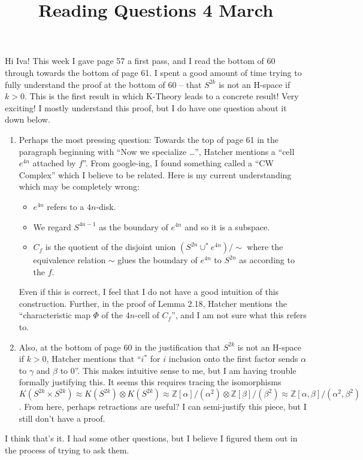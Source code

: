 \documentclass[12]{amsart}
\title{Reading Questions 4 March}
\newcommand{\tiso}{\approx}
\begin{document}
\maketitle

Hi Iva! This week I gave page 57 a first pass, and I read the bottom of 60 through towards the bottom of page 61. I spent a good amount of time trying to fully understand the proof at the bottom of 60 -- that $S^{2k}$ is not an H-space if $k > 0$. This is the first result in which K-Theory leads to a concrete result! Very exciting! I mostly understand this proof, but I do have one question about it down below.

\begin{enumerate}
	\item Perhaps the most pressing question: Towards the top of page 61 in the paragraph beginning with ``Now we specialize \dots '', Hatcher mentions a ``cell $e^{4n}$ attached by $f$''. From google-ing, I found something called a ``CW Complex'' which I believe to be related. Here is my current understanding which may be completely wrong:
	\begin{itemize}
		\item $e^{4n}$ refers to a $4n$-disk.
		\item We regard $S^{4n-1}$ as the boundary of $e^{4n}$ and so it is a subspace.
		\item $C_f$ is the quotient of the disjoint union $(S^{2n} \cup^* e^{4n})/\sim$ where the equivalence relation $\sim$ glues the boundary of $e^{4n}$ to $S^{2n}$ as according to the $f$.
	\end{itemize}
Even if this is correct, I feel that I do not have a good intuition of this construction. Further, in the proof of Lemma 2.18, Hatcher mentions the ``characteristic map $\Phi$ of the $4n$-cell of $C_f$'', and I am not sure what this refers to.
	\item Also, at the bottom of page $60$ in the justification that $S^{2k}$ is not an H-space if $k>0$, Hatcher mentions that ``$i^*$ for $i$ inclusion onto the first factor sends $\alpha$ to $\gamma$ and $\beta$ to $0$''. This makes intuitive sense to me, but I am having trouble formally justifying this. It seems this requires tracing the isomorphisms $K(S^{2k} \times S^{2k}) \tiso K(S^{2k}) \otimes K(S^{2k}) \tiso \mathbb{Z}[\alpha]/(\alpha^2) \otimes \mathbb{Z}[\beta]/(\beta^2) \tiso \mathbb{Z}[\alpha,\beta]/(\alpha^2,\beta^2)$. From here, perhaps retractions are useful? I can semi-justify this piece, but I still don't have a proof.
\end{enumerate}
I think that's it. I had some other questions, but I believe I figured them out in the process of trying to ask them.
\end{document}
